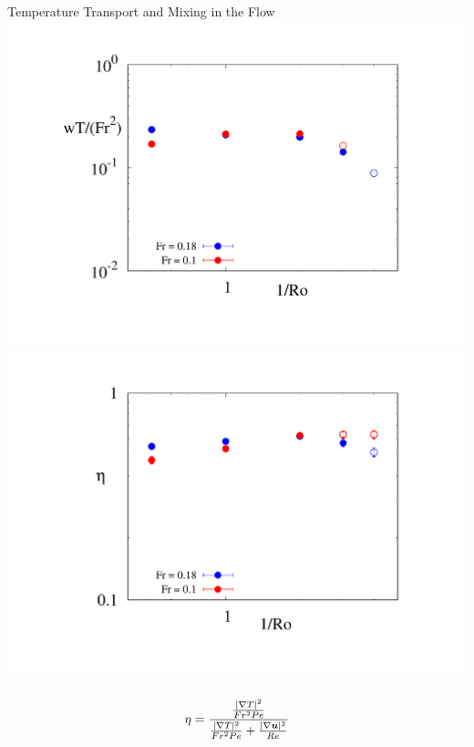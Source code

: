 \documentclass[aspecttatio=169]{beamer}
\begin{document}

\begin{frame}{Temperature Transport and Mixing in the Flow}
        \centering
        \includegraphics[width=1\textwidth]{images/bflux_plot.pdf}
    \emp
        \centering
        \includegraphics[width=.94\textwidth]{images/mixing_plot.pdf}
    \emp

    \vspace{10pt}

        \[\]
    \emp
         \[\eta = \frac{\frac{|\nabla T|^2}{Fr^2Pe}}{\frac{|\nabla T|^2}{Fr^2Pe} +
        \frac{|\nabla \boldsymbol{u}|^2}{Re}}
        \]
    \emp
\end{frame}
\end{document}
